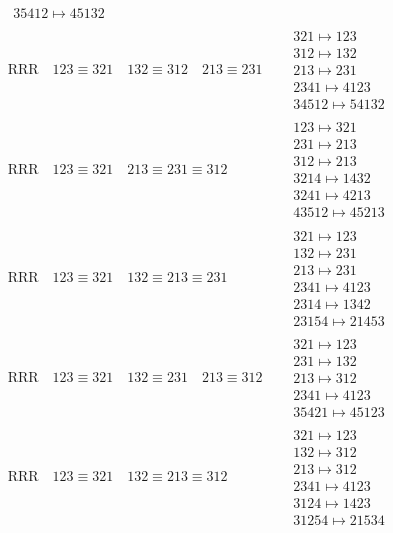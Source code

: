 \documentclass{article}
\begin{document}
\begin{align}
\begin{matrix}
35412 \mapsto 45132
\end{matrix}
\\
\text{RRR}
\quad
123\equiv321
\quad
132\equiv312
\quad
213\equiv231
\quad
&
\begin{matrix}
321 \mapsto 123
\\
312 \mapsto 132
\\
213 \mapsto 231
\\
2341 \mapsto 4123
\\
34512 \mapsto 54132
\end{matrix}
\\
\text{RRR}
\quad
123\equiv321
\quad
213\equiv231\equiv312
\quad
&
\begin{matrix}
123 \mapsto 321
\\
231 \mapsto 213
\\
312 \mapsto 213
\\
3214 \mapsto 1432
\\
3241 \mapsto 4213
\\
43512 \mapsto 45213
\end{matrix}
\\
\text{RRR}
\quad
123\equiv321
\quad
132\equiv213\equiv231
\quad
&
\begin{matrix}
321 \mapsto 123
\\
132 \mapsto 231
\\
213 \mapsto 231
\\
2341 \mapsto 4123
\\
2314 \mapsto 1342
\\
23154 \mapsto 21453
\end{matrix}
\\
\text{RRR}
\quad
123\equiv321
\quad
132\equiv231
\quad
213\equiv312
\quad
&
\begin{matrix}
321 \mapsto 123
\\
231 \mapsto 132
\\
213 \mapsto 312
\\
2341 \mapsto 4123
\\
35421 \mapsto 45123
\end{matrix}
\\
\text{RRR}
\quad
123\equiv321
\quad
132\equiv213\equiv312
\quad
&
\begin{matrix}
321 \mapsto 123
\\
132 \mapsto 312
\\
213 \mapsto 312
\\
2341 \mapsto 4123
\\
3124 \mapsto 1423
\\
31254 \mapsto 21534
\end{matrix}

\end{align}
\end{document}
